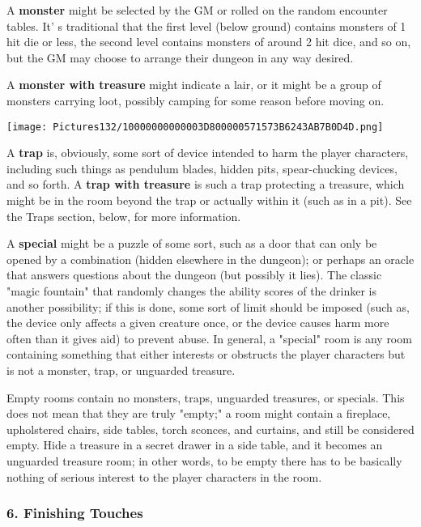 \documentclass[a4paper,twoside,openany,10pt]{book}
\begin{document}
\begin{multicols}{2}
A \textbf{monster} might be selected by the GM or rolled on the random encounter tables. It' s traditional that the first level (below ground) contains monsters of 1 hit die or less, the second level contains monsters of around 2 hit dice, and so on, but the GM may choose to arrange their dungeon in any way desired.

A \textbf{monster with treasure} might indicate a lair, or it might be a group of monsters carrying loot, possibly camping for some reason before moving on. 

\begin{center}
	\texttt{[image: Pictures132/10000000000003D800000571573B6243AB7B0D4D.png]}  
\end{center}

A \textbf{trap} is, obviously, some sort of device intended to harm the player characters, including such things as pendulum blades, hidden pits, spear-chucking devices, and so forth. A \textbf{trap with treasure} is such a trap protecting a treasure, which might be in the room beyond the trap or actually within it (such as in a pit). See the Traps section, below, for more information.

A \textbf{special} might be a puzzle of some sort, such as a door that can only be opened by a combination (hidden elsewhere in the dungeon); or perhaps an oracle that answers questions about the dungeon (but possibly it lies). The classic "magic fountain" that randomly changes the ability scores of the drinker is another possibility; if this is done, some sort of limit should be imposed (such as, the device only affects a given creature once, or the device causes harm more often than it gives aid) to prevent abuse. In general, a "special" room is any room containing something that either interests or obstructs the player characters but is not a monster, trap, or unguarded treasure.

Empty rooms contain no monsters, traps, unguarded treasures, or specials. This does not mean that they are truly "empty;" a room might contain a fireplace, upholstered chairs, side tables, torch sconces, and curtains, and still be considered empty. Hide a treasure in a secret drawer in a side table, and it becomes an unguarded treasure room; in other words,  to be empty there has to be basically nothing of serious interest to the player characters in the room.


\subsubsection{6. Finishing Touches}\label{finishing-touches}


\end{multicols}
\end{document}

